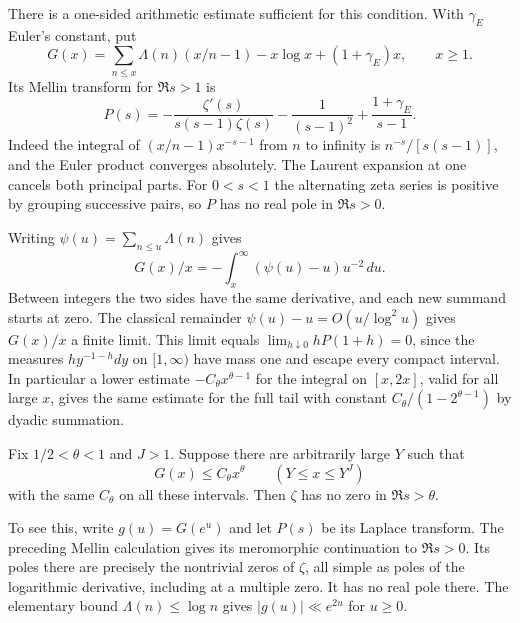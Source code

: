 \documentclass[11pt]{amsart}
\theoremstyle{definition}
\theoremstyle{remark}
\begin{document}
There is a one-sided arithmetic estimate sufficient for this condition.
With $\gamma_E$ Euler's constant, put
\[
 G(x)=\sum_{n\le x}\Lambda(n)(x/n-1)-x\log x+(1+\gamma_E)x,
 \qquad x\ge1.
\]
Its Mellin transform for $\Re s>1$ is
\[
 P(s)=-\frac{\zeta'(s)}{s(s-1)\zeta(s)}
       -\frac1{(s-1)^2}+\frac{1+\gamma_E}{s-1}.
\]
Indeed the integral of $(x/n-1)x^{-s-1}$ from $n$ to infinity
is $n^{-s}/[s(s-1)]$, and the Euler product converges absolutely.
The Laurent expansion at one cancels both principal parts.
For $0<s<1$ the alternating zeta series is positive by grouping
successive pairs, so $P$ has no real pole in $\Re s>0$.

Writing $\psi(u)=\sum_{n\le u}\Lambda(n)$ gives
\[
 G(x)/x=-\int_x^\infty (\psi(u)-u)u^{-2}\,du.
\]
Between integers the two sides have the same derivative, and each
new summand starts at zero. The classical remainder
$\psi(u)-u=O(u/\log^2 u)$ gives $G(x)/x$ a finite limit. This limit
equals $\lim_{h\downarrow0}hP(1+h)=0$, since the measures
$h y^{-1-h}dy$ on $[1,\infty)$ have mass one and escape every
compact interval. In particular a lower estimate
$-C_\theta x^{\theta-1}$ for the integral on $[x,2x]$, valid for
all large $x$, gives the same estimate for the full tail with
constant $C_\theta/(1-2^{\theta-1})$ by dyadic summation.

Fix $1/2<\theta<1$ and $J>1$. Suppose there are arbitrarily large $Y$
such that
\[
 G(x)\le C_\theta x^\theta\qquad(Y\le x\le Y^J)
\]
with the same $C_\theta$ on all these intervals. Then $\zeta$ has no
zero in $\Re s>\theta$.

To see this, write $g(u)=G(e^u)$ and let $P(s)$ be its Laplace
transform. The preceding Mellin calculation gives its meromorphic
continuation to $\Re s>0$. Its poles there are precisely the nontrivial
zeros of $\zeta$, all simple as poles of the logarithmic derivative,
including at a multiple zero. It has no real pole there. The elementary
bound $\Lambda(n)\le\log n$ gives $|g(u)|\ll e^{2u}$ for $u\ge0$.
\end{document}
